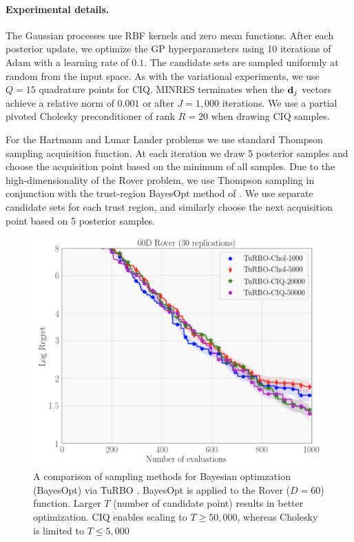 \paragraph{Experimental details.}
The Gaussian processes use RBF kernels and zero mean functions.
After each posterior update, we optimize the GP hyperparameters using 10 iterations of Adam with a learning rate of $0.1$.
The candidate sets are sampled uniformly at random from the input space.
As with the variational experiments, we use $Q = 15$ quadrature points for CIQ.
MINRES terminates when the $\mathbf{d}_j$ vectors achieve a relative norm of $0.001$ or after $J=1,\!000$ iterations.
We use a partial pivoted Cholesky preconditioner of rank $R=20$ when drawing CIQ samples.

For the Hartmann and Lunar Lander problems we use standard Thompson sampling acquisition function.
At each iteration we draw 5 posterior samples and choose the acquisition point based on the minimum of all samples.
Due to the high-dimensionality of the Rover problem, we use Thompson sampling in conjunction with the trust-region BayesOpt method of \citet{eriksson2019scalable}.
We use separate candidate sets for each trust region, and similarly choose the next acquisition point based on 5 posterior samples.

\begin{figure}[t!]
  \centering
  \includegraphics[width=0.7\linewidth]{figures/rover.png}
  \caption[
    A comparison of sampling methods for Bayesian optimzation (BayesOpt) via TuRBO \cite{eriksson2019scalable}.
    BayesOpt is applied to the Rover ($D=60$) function.
  ]{
    A comparison of sampling methods for Bayesian optimzation (BayesOpt) via TuRBO \cite{eriksson2019scalable}.
    BayesOpt is applied to the Rover ($D=60$) function.
    Larger $T$ (number of candidate point) results in better optimization.
    CIQ enables scaling to $T\geq50,\!000$, whereas Cholesky is limited to $T\leq5,\!000$
  }
  \label{fig:rover}
\end{figure}

